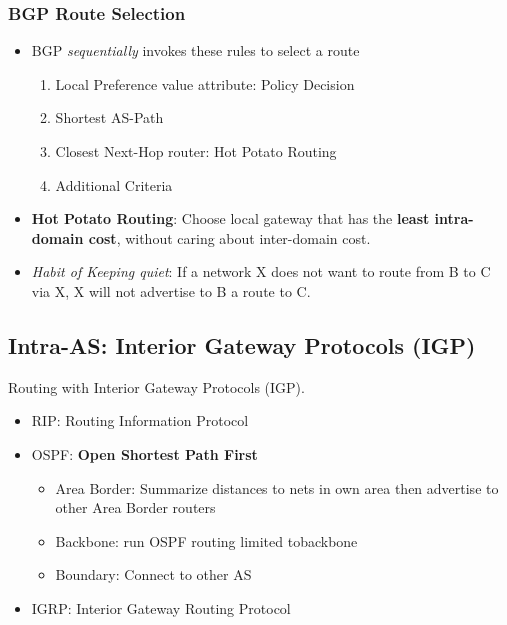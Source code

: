 \documentclass[a4paper]{article}
\begin{document}
\subsubsection{BGP Route Selection}
\begin{itemize}
    \item BGP \textit{sequentially} invokes these rules to select a route
    \begin{enumerate}
        \item  Local Preference value attribute: Policy Decision
        \item Shortest AS-Path
        \item Closest Next-Hop router: Hot Potato Routing
        \item Additional Criteria
    \end{enumerate}
    \item \textbf{Hot Potato Routing}: Choose local gateway that has the \textbf{least intra-domain cost}, without caring about inter-domain cost.
    \item \textit{Habit of Keeping quiet}: If a network X does not want to route from B to C via X, X will not advertise to B a route to C.
\end{itemize}

\subsection{Intra-AS: Interior Gateway Protocols (IGP)}
Routing with Interior Gateway Protocols (IGP).
\begin{itemize}
    \item RIP: Routing Information Protocol
    \item OSPF: \textbf{Open Shortest Path First}
    \begin{itemize}[label=$\circ$]
        \item Area Border: Summarize distances to nets in own area then advertise to other Area Border routers
        \item Backbone: run OSPF routing limited tobackbone
        \item Boundary: Connect to other AS
    \end{itemize}
    \item IGRP: Interior Gateway Routing Protocol
\end{itemize}

\newpage
\end{document}
